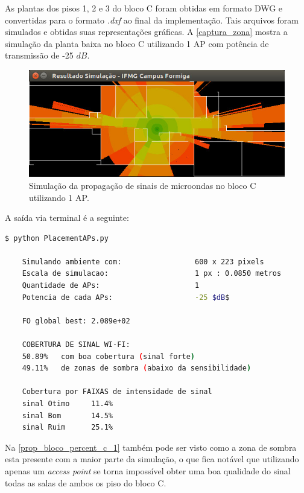 \documentclass[
	12pt,				%
	twoside,			%
	a4paper,			%
	english,			%
	french,				%
	spanish,			%
	brazil				%
	]{abntex2}
\begin{document}
As plantas dos pisos 1, 2 e 3 do bloco C foram obtidas em formato DWG e
convertidas para o formato \emph{.dxf} ao final da implementação. Tais
arquivos foram simulados e obtidas suas representações gráficas. A
\autoref{captura_zona} mostra a simulação da planta baixa no bloco C
utilizando 1 AP com potência de transmissão de -25 \(dB\).

\begin{figure}[ht]
    \caption{\label{captura_zona} Simulação da propagação de sinais de microondas no bloco C utilizando 1 AP.
        }
    \begin{center}
        \includegraphics[scale=0.7]{imagens/captura-zona-2.jpg}
    \end{center}
\end{figure}

A saída via terminal é a seguinte:

\begin{lstlisting}[language=bash]
    $ python PlacementAPs.py 
    
    Simulando ambiente com:                 600 x 223 pixels
    Escala de simulacao:                    1 px : 0.0850 metros
    Quantidade de APs:                      1
    Potencia de cada APs:                   -25 $dB$
    
    FO global best: 2.089e+02
    
    COBERTURA DE SINAL WI-FI:
    50.89%   com boa cobertura (sinal forte)
    49.11%   de zonas de sombra (abaixo da sensibilidade)
    
    Cobertura por FAIXAS de intensidade de sinal
    sinal Otimo     11.4%
    sinal Bom       14.5%
    sinal Ruim      25.1%

\end{lstlisting}

Na \autoref{prop_bloco_percent_c_1} também pode ser visto como a zona de
sombra esta presente com a maior parte da simulação, o que fica notável
que utilizando apenas um \emph{access point} se torna impossível obter
uma boa qualidade do sinal todas as salas de ambos os piso do bloco C.
\end{document}
